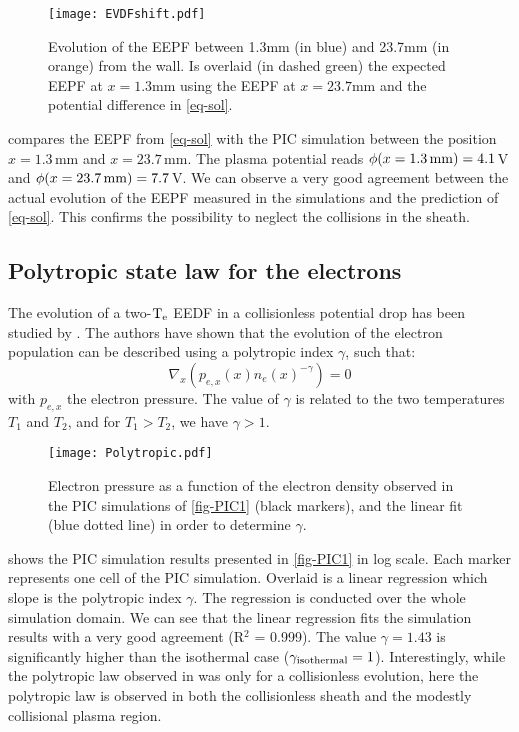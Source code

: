 \begin{figure}[!hbtp]
  \centering
  \texttt{[image: EVDFshift.pdf]}
  \caption{Evolution of the EEPF between 1.3mm (in blue) and 23.7mm (in orange) from the wall. Is overlaid (in dashed green) the expected  EEPF at $x=1.3$mm using the EEPF at $x=23.7$mm and the potential difference in \cref{eq-sol}. }
  \label{fig-PICEEPF}
\end{figure}

 compares the EEPF from \cref{eq-sol} with the PIC simulation between the position $x=1.3$\,mm and $x=23.7$\,mm.
The plasma potential reads $\phi(x=1.3\,{\rm mm})=4.1$\,V and  $\phi(x=23.7\,{\rm mm})=7.7$\,V.
We can observe a very good agreement between the actual evolution of the EEPF measured in the simulations and the prediction of \cref{eq-sol}.
This confirms the possibility to neglect the collisions in the sheath.

\subsection{Polytropic state law for the electrons}

The evolution of a two-$\mathrm{T_e}$ EEDF  in a collisionless potential drop has been studied by \citet{zhang2016}.
The authors have shown that the evolution of the electron population can be described using a polytropic index $\gamma$, such that\string:
\begin{equation}
  \label{eq-poly}
  \nabla_x \left( p_{e,x}(x) n_e(x)^{-\gamma} \right)= 0
\end{equation}
with $p_{e,x}$ the electron pressure.
The value of $\gamma$ is related to the two temperatures $T_1$ and $T_2$, and for $T_1 > T_2$, we have $\gamma > 1 $.




\begin{figure}[!htbp]
  \centering
  \texttt{[image: Polytropic.pdf]}
  \caption{Electron pressure as a function of the electron density observed in the PIC simulations of \cref{fig-PIC1} (black markers), and the linear fit (blue dotted line) in order to determine $\gamma$.}
  \label{fig-polyFit}
\end{figure}

 shows the PIC simulation results presented in \cref{fig-PIC1} in log scale.
Each marker represents one cell of the PIC simulation.
Overlaid is a linear regression which slope is the polytropic index $\gamma$.
The regression is conducted over the whole simulation domain.
We can see that the linear regression fits the simulation results with a very good agreement (R$^2$ = 0.999).
The value $\gamma = 1.43$ is significantly higher than the isothermal case ($\gamma_{\rm isothermal} = 1$).
Interestingly, while the polytropic law observed in \citet{zhang2016} was only for a collisionless evolution, here the polytropic law is observed in both the collisionless sheath and the modestly collisional plasma region.

